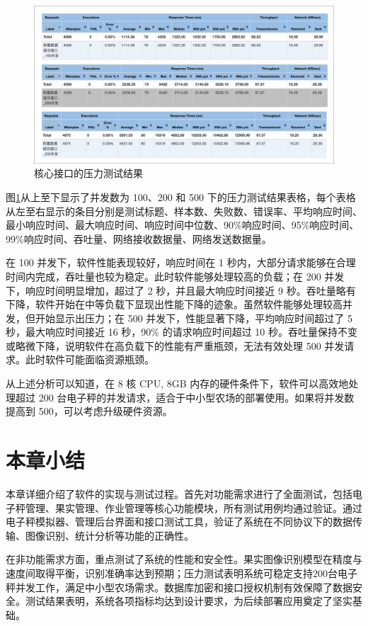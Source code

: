 \begin{figure}
    \centering
    \includegraphics[width=0.9\linewidth]{../source/aws-test/result.png}
    \caption{核心接口的压力测试结果}
    \label{fig:jmeter-test-result}
\end{figure}

图\ref{fig:jmeter-test-result}从上至下显示了并发数为 100、200 和 500 下的压力测试结果表格，每个表格从左至右显示的条目分别是测试标题、样本数、失败数、错误率、平均响应时间、最小响应时间、最大响应时间、响应时间中位数、90\%响应时间、95\%响应时间、99\%响应时间、吞吐量、网络接收数据量、网络发送数据量。

在 100 并发下，软件性能表现较好，响应时间在 1 秒内，大部分请求能够在合理时间内完成，吞吐量也较为稳定。此时软件能够处理较高的负载；在 200 并发下，响应时间明显增加，超过了 2 秒，并且最大响应时间接近 9 秒。吞吐量略有下降，软件开始在中等负载下显现出性能下降的迹象。虽然软件能够处理较高并发，但开始显示出压力；在 500 并发下，性能显著下降，平均响应时间超过了 5 秒，最大响应时间接近 16 秒，90\% 的请求响应时间超过 10 秒。吞吐量保持不变或略微下降，说明软件在高负载下的性能有严重瓶颈，无法有效处理 500 并发请求。此时软件可能面临资源瓶颈。

从上述分析可以知道，在 8 核 CPU, 8GB 内存的硬件条件下，软件可以高效地处理超过 200 台电子秤的并发请求，适合于中小型农场的部署使用。如果将并发数提高到 500，可以考虑升级硬件资源。

\section{本章小结}

本章详细介绍了软件的实现与测试过程。首先对功能需求进行了全面测试，包括电子秤管理、果实管理、作业管理等核心功能模块，所有测试用例均通过验证。通过电子秤模拟器、管理后台界面和接口测试工具，验证了系统在不同协议下的数据传输、图像识别、统计分析等功能的正确性。

在非功能需求方面，重点测试了系统的性能和安全性。果实图像识别模型在精度与速度间取得平衡，识别准确率达到预期；压力测试表明系统可稳定支持200台电子秤并发工作，满足中小型农场需求。数据库加密和接口授权机制有效保障了数据安全。测试结果表明，系统各项指标均达到设计要求，为后续部署应用奠定了坚实基础。
